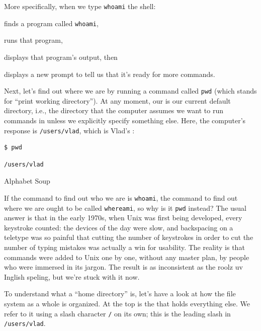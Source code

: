 \documentclass{book}
\begin{document}
More specifically, when we type \texttt{whoami} the shell:

\begin{swcenumerate}
\item
  finds a program called \texttt{whoami},
\item
  runs that program,
\item
  displays that program's output, then
\item
  displays a new prompt to tell us that it's ready for more commands.
\end{swcenumerate}

Next, let's find out where we are by running a command called
\texttt{pwd} (which stands for ``print working directory''). At any
moment, our  is our current default directory, i.e., the directory that
the computer assumes we want to run commands in unless we explicitly
specify something else. Here, the computer's response is
\texttt{/users/vlad}, which is Vlad's :

\begin{verbatim}
$ pwd
\end{verbatim}

\begin{verbatim}
/users/vlad
\end{verbatim}

\begin{swcbox}{Alphabet Soup}

If the command to find out who we are is \texttt{whoami}, the command to
find out where we are ought to be called \texttt{whereami}, so why is it
\texttt{pwd} instead? The usual answer is that in the early 1970s, when
Unix was first being developed, every keystroke counted: the devices of
the day were slow, and backspacing on a teletype was so painful that
cutting the number of keystrokes in order to cut the number of typing
mistakes was actually a win for usability. The reality is that commands
were added to Unix one by one, without any master plan, by people who
were immersed in its jargon. The result is as inconsistent as the roolz
uv Inglish speling, but we're stuck with it now.

\end{swcbox}

To understand what a ``home directory'' is, let's have a look at how the
file system as a whole is organized. At the top is the
 that holds everything else.
We refer to it using a slash character \texttt{/} on its own; this is
the leading slash in \texttt{/users/vlad}.
\end{document}
